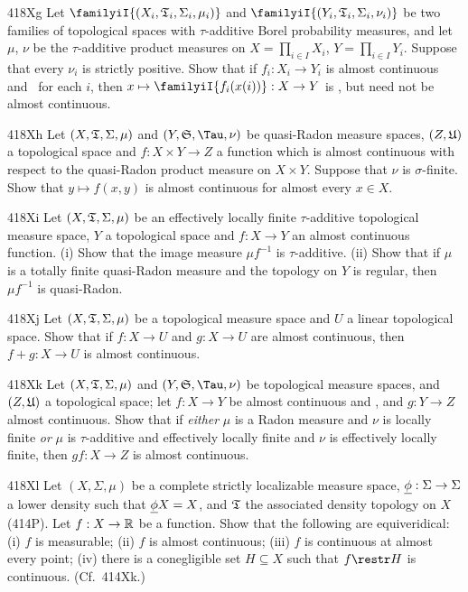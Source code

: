 {\spheader 418Xg Let $\familyiI{(X_i,\frak T_i,\Sigma_i,\mu_i)}$ and
$\familyiI{(Y_i,\frak T_i,\Sigma_i,\nu_i)}$ be two families of
topological
spaces with $\tau$-additive Borel probability measures, and let $\mu$,
$\nu$ be the $\tau$-additive product measures on $X=\prod_{i\in I}X_i$,
$Y=\prod_{i\in I}Y_i$.   Suppose that every $\nu_i$ is strictly
positive.
Show that if $f_i:X_i\to Y_i$ is almost continuous and \imp\ for each
$i$, then $x\mapsto\familyiI{f_i(x(i))}:X\to Y$ is \imp, but need not be
almost continuous.

\spheader 418Xh Let $(X,\frak T,\Sigma,\mu)$ and $(Y,\frak S,\Tau,\nu)$
be quasi-Radon measure spaces, $(Z,\frak U)$ a topological space and
$f:X\times Y\to Z$ a function which is almost continuous with respect to
the quasi-Radon product measure on $X\times Y$.   Suppose that $\nu$ is
$\sigma$-finite.   Show that $y\mapsto f(x,y)$ is almost continuous for
almost every $x\in X$.

\spheader 418Xi Let $(X,\frak T,\Sigma,\mu)$ be an effectively locally
finite $\tau$-additive topological measure space, $Y$ a topological
space and $f:X\to Y$ an almost continuous function.   (i) Show that the
image measure $\mu f^{-1}$ is $\tau$-additive.   (ii) Show that if $\mu$
is a totally finite quasi-Radon measure and the topology on $Y$ is
regular, then $\mu f^{-1}$ is quasi-Radon.

\spheader 418Xj Let $(X,\frak T,\Sigma,\mu)$ be a topological measure
space and $U$ a linear topological space.   Show that if $f:X\to U$ and
$g:X\to U$ are almost continuous, then $f+g:X\to U$ is almost
continuous.

\spheader 418Xk Let $(X,\frak T,\Sigma,\mu)$ and $(Y,\frak S,\Tau,\nu)$
be topological measure spaces, and $(Z,\frak U)$ a topological space;
let $f:X\to Y$ be almost continuous and \imp, and $g:Y\to Z$ almost
continuous.   Show that if {\it either} $\mu$ is a Radon measure
and $\nu$ is locally finite {\it or} $\mu$ is $\tau$-additive and
effectively locally finite and $\nu$ is effectively locally finite, then
$gf:X\to Z$ is almost continuous.   

\spheader 418Xl Let $(X,\Sigma,\mu)$ be a complete strictly localizable
measure space, $\underline{\phi}:\Sigma\to\Sigma$ a lower density such that
$\underline{\phi} X=X$, and $\frak T$ the associated density topology on $X$
(414P).   Let
$f:X\to\Bbb R$ be a function.   Show that the following are
equiveridical:  (i) $f$ is
measurable;  (ii) $f$ is almost continuous;  (iii) $f$ is continuous at
almost every point;  (iv) there is a conegligible set $H\subseteq X$
such that $f\restr H$ is continuous.   (Cf.\ 414Xk.)

}
